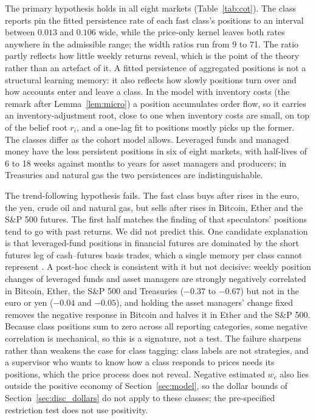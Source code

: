 \documentclass[12pt]{article}
\theoremstyle{definition}
\theoremstyle{remark}
\begin{document}
The primary hypothesis holds in all eight markets (Table~\ref{tab:cot}). The class reports pin the fitted persistence rate of each fast class's positions to an interval between $0.013$ and $0.106$ wide, while the price-only kernel leaves both rates anywhere in the admissible range; the width ratios run from 9 to 71. The ratio partly reflects how little weekly returns reveal, which is the point of the theory rather than an artefact of it. A fitted persistence of aggregated positions is not a structural learning memory: it also reflects how slowly positions turn over and how accounts enter and leave a class. In the model with inventory costs (the remark after Lemma~\ref{lem:micro}) a position accumulates order flow, so it carries an inventory-adjustment root, close to one when inventory costs are small, on top of the belief root $r_i$, and a one-lag fit to positions mostly picks up the former. The classes differ as the cohort model allows. Leveraged funds and managed money have the less persistent positions in six of eight markets, with half-lives of 6 to 18 weeks against months to years for asset managers and producers; in Treasuries and natural gas the two persistences are indistinguishable.

The trend-following hypothesis fails. The fast class buys after rises in the euro, the yen, crude oil and natural gas, but sells after rises in Bitcoin, Ether and the S\&P 500 futures. The first half matches the finding of \citet{moskowitz2012} that speculators' positions tend to go with past returns. We did not predict this. One candidate explanation is that leveraged-fund positions in financial futures are dominated by the short futures leg of cash--futures basis trades, which a single memory per class cannot represent \citep{barth2021}. A post-hoc check is consistent with it but not decisive: weekly position changes of leveraged funds and asset managers are strongly negatively correlated in Bitcoin, Ether, the S\&P 500 and Treasuries ($-0.37$ to $-0.67$) but not in the euro or yen ($-0.04$ and $-0.05$), and holding the asset managers' change fixed removes the negative response in Bitcoin and halves it in Ether and the S\&P 500. Because class positions sum to zero across all reporting categories, some negative correlation is mechanical, so this is a signature, not a test. The failure sharpens rather than weakens the case for class tagging: class labels are not strategies, and a supervisor who wants to know how a class responds to prices needs its positions, which the price process does not reveal. Negative estimated $w_c$ also lies outside the positive economy of Section~\ref{sec:model}, so the dollar bounds of Section~\ref{sec:disc_dollars} do not apply to these classes; the pre-specified restriction test does not use positivity.
\end{document}
